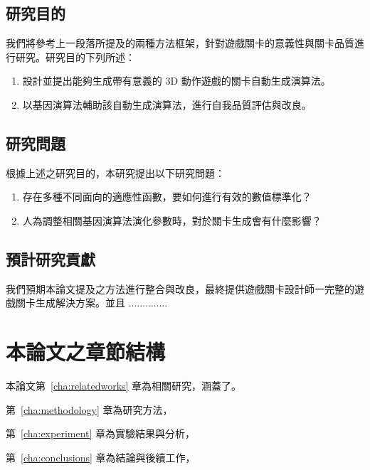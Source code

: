 \subsection{研究目的}

我們將參考上一段落所提及的兩種方法框架，針對遊戲關卡的意義性與關卡品質進行研究。研究目的下列所述：

\begin{enumerate}
  \setlength\itemsep{-0.5em}
  \item 設計並提出能夠生成帶有意義的 3D 動作遊戲的關卡自動生成演算法。
  \item 以基因演算法輔助該自動生成演算法，進行自我品質評估與改良。
\end{enumerate}

\subsection{研究問題}

根據上述之研究目的，本研究提出以下研究問題：

\begin{enumerate}
  \setlength\itemsep{-0.5em}
  \item 存在多種不同面向的適應性函數，要如何進行有效的數值標準化？
  \item 人為調整相關基因演算法演化參數時，對於關卡生成會有什麼影響？
\end{enumerate}

\subsection{預計研究貢獻}

我們預期本論文提及之方法進行整合與改良，最終提供遊戲關卡設計師一完整的遊戲關卡生成解決方案。並且 ..............

\section{本論文之章節結構}

本論文第~\ref{cha:relatedworks} 章為相關研究，涵蓋了。

第~\ref{cha:methodology} 章為研究方法，

第~\ref{cha:experiment} 章為實驗結果與分析，

第~\ref{cha:conclusions} 章為結論與後續工作，